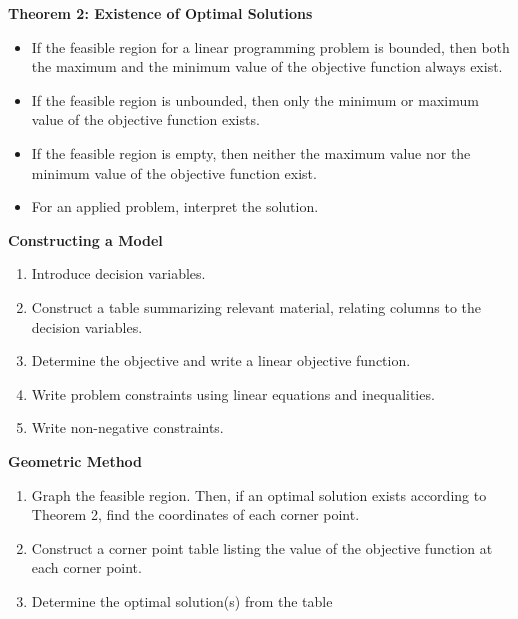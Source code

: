 \documentclass[14pt]{extarticle}
\begin{document}
\begin{tcolorbox}[enhanced jigsaw,colback=bg,boxrule=0pt,arc=0pt]
	\textbf{Theorem 2: Existence of Optimal Solutions}
	\begin{itemize}
		\item If the feasible region for a linear programming problem is bounded, then both the maximum and the minimum value of the objective function always exist.
		\item If the feasible region is unbounded, then only the minimum or maximum value of the objective function exists.
		\item If the feasible region is empty, then neither the maximum value nor the minimum value of the objective function exist.
		\item For an applied problem, interpret the solution.
	\end{itemize}
\end{tcolorbox}

\begin{tcolorbox}[enhanced jigsaw,colback=bg,boxrule=0pt,arc=0pt]
	\textbf{Constructing a Model}
	\begin{enumerate}
		\item Introduce decision variables.
		\item Construct a table summarizing relevant material, relating columns to the decision variables.
		\item Determine the objective and write a linear objective function.
		\item Write problem constraints using linear equations and inequalities.
		\item Write non-negative constraints.
	\end{enumerate}
\end{tcolorbox}

\begin{tcolorbox}[enhanced jigsaw,colback=bg,boxrule=0pt,arc=0pt]
	\textbf{Geometric Method}
	\begin{enumerate}
		\item Graph the feasible region. Then, if an optimal solution 	exists according to Theorem 2, find the coordinates of 	each corner point.
		\item Construct a corner point table listing the value of the objective function at each corner point.
		\item Determine the optimal solution(s) from the table 
	\end{enumerate}
\end{tcolorbox}
\end{document}
